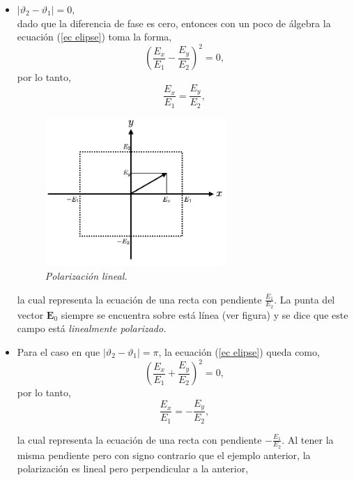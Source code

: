 \documentclass[11pt,fleqn]{book} %
\begin{document}
\begin{itemize}
 \item $|\vartheta_2-\vartheta_1|=0,$\\
 dado que la diferencia de fase es cero, entonces con un poco de \'algebra la ecuaci\'on (\ref{ec elipse}) toma la forma,
\begin{equation*}
\left( \frac{E_x}{E_1} - \frac{E_y}{E_2}\right)^2=0,
\end{equation*}
por lo tanto,
\begin{equation}
\frac{E_x}{E_1} = \frac{E_y}{E_2},
\end{equation}

\begin{figure}[h!]  \label{figuras}
\centering
\includegraphics[width=0.65\textwidth]{Pictures/polarizacionxy.png}
\caption{\textit{Polarizaci\'on lineal.}}
\end{figure}


la cual representa la ecuaci\'on de una recta con pendiente $\frac{E_1}{E_2}$. La punta del vector $\textbf{E}_0$ siempre se encuentra
sobre est\'a l\'inea (ver figura) y se dice que este campo est\'a \textit{linealmente polarizado.}
\end{itemize}

\begin{itemize}
 \item Para el caso en que $|\vartheta_2-\vartheta_1|=\pi$, la ecuaci\'on (\ref{ec elipse}) queda como,
\begin{equation*}
\left( \frac{E_x}{E_1} + \frac{E_y}{E_2}\right)^2=0,
\end{equation*}
por lo tanto,
\begin{equation}
\frac{E_x}{E_1} = -\frac{E_y}{E_2},
\end{equation}



la cual representa la ecuaci\'on de una recta con pendiente $-\frac{E_1}{E_2}$. Al tener la misma pendiente pero con signo contrario que
el ejemplo anterior, la polarizaci\'on es lineal pero perpendicular a la anterior,
 \end{itemize}
\end{document}
